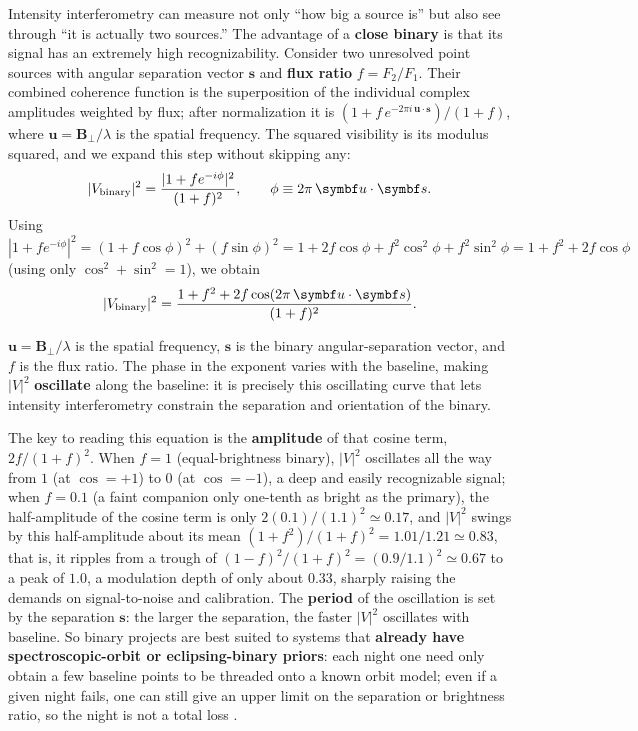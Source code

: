 Intensity interferometry can measure not only ``how big a source is'' but also see through ``it is actually two sources.'' The advantage of a \textbf{close binary} is that its signal has an extremely high recognizability. Consider two unresolved point sources with angular separation vector \(\bm s\) and \textbf{flux ratio} \(f=F_2/F_1\). Their combined coherence function is the superposition of the individual complex amplitudes weighted by flux; after normalization it is \((1+f\,e^{-2\pi i\,\bm u\cdot\bm s})/(1+f)\), where \(\bm u=\bm B_\perp/\lambda\) is the spatial frequency. The squared visibility is its modulus squared, and we expand this step without skipping any:
\[
  |V_{\rm binary}|^2
  =\frac{|1+f e^{-i\phi}|^2}{(1+f)^2},
  \qquad \phi\equiv 2\pi\,\bm u\cdot\bm s .
\]
Using \(|1+f e^{-i\phi}|^2=(1+f\cos\phi)^2+(f\sin\phi)^2=1+2f\cos\phi+f^2\cos^2\phi+f^2\sin^2\phi=1+f^2+2f\cos\phi\) (using only \(\cos^2+\sin^2=1\)), we obtain
\begin{equation}
  |V_{\rm binary}|^2
  =
  \frac{1+f^2+2f\cos(2\pi\,\bm u\cdot\bm s)}
  {(1+f)^2}.
  \label{eq:e25-binary-visibility}
\end{equation}
\begin{formulaexplain}
\(\bm u=\bm B_\perp/\lambda\) is the spatial frequency, \(\bm s\) is the binary angular-separation vector, and \(f\) is the flux ratio. The phase in the exponent varies with the baseline, making \(|V|^2\) \textbf{oscillate} along the baseline: it is precisely this oscillating curve that lets intensity interferometry constrain the separation and orientation of the binary.
\end{formulaexplain}
The key to reading this equation is the \textbf{amplitude} of that cosine term, \(2f/(1+f)^2\). When \(f=1\) (equal-brightness binary), \(|V|^2\) oscillates all the way from \(1\) (at \(\cos=+1\)) to \(0\) (at \(\cos=-1\)), a deep and easily recognizable signal; when \(f=0.1\) (a faint companion only one-tenth as bright as the primary), the half-amplitude of the cosine term is only \(2(0.1)/(1.1)^2\simeq0.17\), and \(|V|^2\) swings by this half-amplitude about its mean \((1+f^2)/(1+f)^2=1.01/1.21\simeq0.83\), that is, it ripples from a trough of \((1-f)^2/(1+f)^2=(0.9/1.1)^2\simeq0.67\) to a peak of \(1.0\), a modulation depth of only about \(0.33\), sharply raising the demands on signal-to-noise and calibration. The \textbf{period} of the oscillation is set by the separation \(\bm s\): the larger the separation, the faster \(|V|^2\) oscillates with baseline. So binary projects are best suited to systems that \textbf{already have spectroscopic-orbit or eclipsing-binary priors}: each night one need only obtain a few baseline points to be threaded onto a known orbit model; even if a given night fails, one can still give an upper limit on the separation or brightness ratio, so the night is not a total loss \citep{1974MNRAS.167..121H,2012MNRAS.419..172N,2014MNRAS.437..798M,2022MNRAS.512.1722K}.

